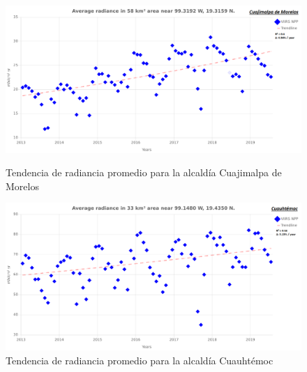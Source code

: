 \begin{figure}[H]
  \centering
    \includegraphics[width=1\textwidth]{CM}
  \caption{Tendencia de radiancia promedio para la alcaldía Cuajimalpa de Morelos}
  \label{radiancetrendscm}
\vspace{20mm} 
    \includegraphics[width=1\textwidth]{CUA}
  \caption{Tendencia de radiancia promedio para la alcaldía Cuauhtémoc}
  \label{radiancetrendscua}
\end{figure}
\blindtext

\newpage

